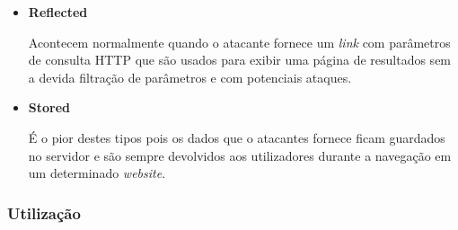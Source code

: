 \documentclass[10pt,english]{article}
\begin{document}
\begin{itemize}
    \item \textbf{Reflected}
    \par Acontecem normalmente quando o atacante fornece um \textit{link} com parâmetros de consulta HTTP que são usados para exibir uma página de resultados sem a devida filtração de parâmetros e com potenciais ataques.
    
    \item \textbf{Stored}
    \par É o pior destes tipos pois os dados que o atacantes fornece ficam guardados no servidor e são sempre devolvidos aos utilizadores durante a navegação em um determinado \textit{website}.
\end{itemize}


\subsubsection{Utilização}
\end{document}
